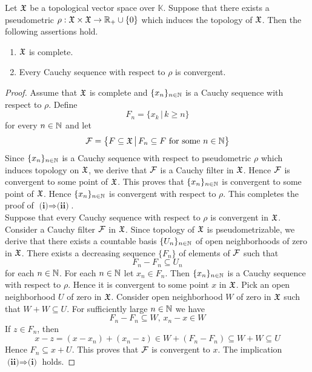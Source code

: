 \begin{theorem}\label{theorem:pseudometrizability_completeness_is_determined_by_Cauchy_sequences}
Let ${\mathfrak X}$ be a topological vector space over $\mathbb{K}$. Suppose that there exists a pseudometric $\rho:{\mathfrak X}\times {\mathfrak X} \rightarrow {\mathbb R}_+\cup \{0\}$ which induces the topology of ${\mathfrak X}$. Then the following assertions hold.
\begin{enumerate}[label=\emph{\textbf{(\roman*)}}, leftmargin=*]
\item ${\mathfrak X}$ is complete.
\item Every Cauchy sequence with respect to $\rho$ is convergent.
\end{enumerate}
\end{theorem}
\begin{proof}
Assume that ${\mathfrak X}$ is complete and $\{x_n\}_{n\in {\mathbb N}}$ is a Cauchy sequence with respect to $\rho$. Define
$$F_n = \big\{x_k\,\big|\,k\geq n\big\}$$
for every $n\in {\mathbb N}$ and let 
$${\mathcal F} = \big\{F\subseteq {\mathfrak X}\,\big|\,F_n \subseteq F\mbox{ for some }n\in {\mathbb N}\big\}$$
Since $\{x_n\}_{n\in {\mathbb N}}$ is a Cauchy sequence with respect to pseudometric $\rho$ which induces topology on ${\mathfrak X}$, we derive that ${\mathcal F}$ is a Cauchy filter in ${\mathfrak X}$. Hence ${\mathcal F}$ is convergent to some point of ${\mathfrak X}$. This proves that $\{x_n\}_{n\in {\mathbb N}}$ is convergent to some point of ${\mathfrak X}$. Hence $\{x_n\}_{n\in {\mathbb N}}$ is convergent with respect to $\rho$. This completes the proof of $\textbf{(i)}\Rightarrow \textbf{(ii)}$.\\
Suppose that every Cauchy sequence with respect to $\rho$ is convergent in ${\mathfrak X}$. Consider a Cauchy filter ${\mathcal F}$ in ${\mathfrak X}$. Since topology of ${\mathfrak X}$ is pseudometrizable, we derive that there exists a countable basis $\{U_n\}_{n\in {\mathbb N}}$ of open neighborhoods of zero in ${\mathfrak X}$. There exists a decreasing sequence $\{F_n\}$ of elements of ${\mathcal F}$ such that
$$F_n - F_n\subseteq U_n$$
for each $n\in {\mathbb N}$. For each $n\in {\mathbb N}$ let $x_n \in F_n$. Then $\{x_n\}_{n\in {\mathbb N}}$ is a Cauchy sequence with respect to $\rho$. Hence it is convergent to some point $x$ in ${\mathfrak X}$. Pick an open neighborhood $U$ of zero in ${\mathfrak X}$. Consider open neighborhood $W$ of zero in ${\mathfrak X}$ such that $W + W \subseteq U$. For sufficiently large $n\in {\mathbb N}$ we have 
$$F_n - F_n \subseteq W,\,x_n - x \in W$$
If $z \in F_n$, then
$$x - z = (x - x_n) + (x_n - z) \in W + (F_n - F_n) \subseteq W + W \subseteq U$$
Hence $F_n \subseteq x + U$. This proves that ${\mathcal F}$ is convergent to $x$. The implication $\textbf{(ii)}\Rightarrow \textbf{(i)}$ holds.  
\end{proof}

